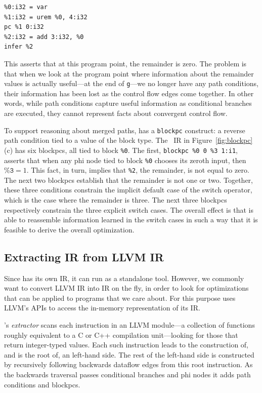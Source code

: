 {\small\begin{verbatim}
%0:i32 = var
%1:i32 = urem %0, 4:i32
pc %1 0:i32
%2:i32 = add 3:i32, %0
infer %2
\end{verbatim}}

This asserts that at this program point, the remainder is zero.
%
The problem is that when we look at the program point where
information about the remainder values is actually useful---at the end
of \texttt{g}---we no longer have any path conditions, their
information has been lost as the control flow edges come together.
%
In other words, while path conditions capture useful information as
conditional branches are executed, they cannot represent facts about
convergent control flow.


To support reasoning about merged paths, \tool{} has a
\texttt{blockpc} construct: a reverse path condition tied to a value
of the block type.
%
The \tool~IR in Figure~\ref{fig:blockpc}(c) has six blockpcs, all tied
to block \texttt{\%0}.
%
The first, \texttt{blockpc \%0 0 \%3 1:i1}, asserts that when any phi
node tied to block \texttt{\%0} chooses its zeroth input, then
$\texttt{\%3} = 1$.
%
This fact, in turn, implies that \texttt{\%2}, the remainder, is not
equal to zero.
%
The next two blockpcs establish that the remainder is not one or two.
%
Together, these three conditions constrain the implicit default case
of the switch operator, which is the case where the remainder is three.
%
The next three blockpcs respectively constrain the three explicit
switch cases.
%
The overall effect is that \tool{} is able to reassemble information
learned in the switch cases in such a way that it is feasible to
derive the overall optimization.


\subsection{Extracting \tool{} IR from LLVM IR}

Since \tool{} has its own IR, it can run as a standalone tool.
%
However, we commonly want to convert LLVM IR into \tool{} IR on the fly, in
order to look for optimizations that can be applied to programs that we care
about.
%
For this purpose \tool{} uses LLVM's APIs to access the in-memory
representation of its IR\@.


\tool's \emph{extractor} scans each instruction in an LLVM module---a collection
of functions roughly equivalent to a C or C++ compilation unit---looking for
those that return integer-typed values.
%
Each such instruction leads to the construction of, and is the root
of, an \tool{} left-hand side.
%
The rest of the left-hand side is constructed by recursively following backwards
dataflow edges from this root instruction.
%
As the backwards traversal passes conditional branches and phi nodes
it adds path conditions and blockpcs.


